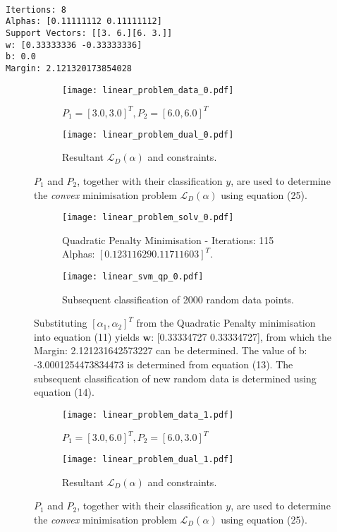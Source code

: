 \documentclass[10pt, a4paper,reqno]{amsart}
\begin{document}
\begin{verbatim}

Itertions: 8
Alphas: [0.11111112 0.11111112]
Support Vectors: [[3. 6.][6. 3.]]
w: [0.33333336 -0.33333336]
b: 0.0
Margin: 2.121320173854028

\end{verbatim}

\begin{figure}[H]
	\centering	
	\begin{subfigure}{1.0\textwidth}
		\centering
		\texttt{[image: linear\_problem\_data\_0.pdf]}
		\caption{$P_1 = [3.0, 3.0]^T, P_2 = [6.0, 6.0]^T$}
	\end{subfigure}
	\begin{subfigure}{1.0\textwidth}
		\centering
		\texttt{[image: linear\_problem\_dual\_0.pdf]}
		\caption{Resultant $\mathcal{L}_D(\alpha)$ and constraints.}
	\end{subfigure}
	\caption{$P_1$ and $P_2$, together with their classification $y$, are used to determine the \emph{convex} minimisation problem $\mathcal{L}_D(\alpha)$ using equation (25).}
\end{figure}

\begin{figure}[H]
	\centering	
	\begin{subfigure}{1.0\textwidth}
		\centering
		\texttt{[image: linear\_problem\_solv\_0.pdf]}
		\caption{Quadratic Penalty Minimisation - Iterations: 115 Alphas: $[0.12311629 0.11711603]^T$.}
	\end{subfigure}
	\begin{subfigure}{1.0\textwidth}
		\centering
		\texttt{[image: linear\_svm\_qp\_0.pdf]}
		\caption{Subsequent classification of 2000 random data points.}
	\end{subfigure}
	\caption{Substituting $[\alpha_1, \alpha_2]^T$ from the Quadratic Penalty minimisation into equation (11) yields $\mathbf{w}$:
 [0.33334727 0.33334727], from which the Margin: 2.121231642573227 can be determined. The value of b: -3.0001254473834473 is determined from equation (13). The subsequent classification of new random data is determined using equation (14).}
\end{figure}

\begin{figure}[H]
	\centering	
	\begin{subfigure}{1.0\textwidth}
		\centering
		\texttt{[image: linear\_problem\_data\_1.pdf]}
		\caption{$P_1 = [3.0, 6.0]^T, P_2 = [6.0, 3.0]^T$}
	\end{subfigure}
	\begin{subfigure}{1.0\textwidth}
		\centering
		\texttt{[image: linear\_problem\_dual\_1.pdf]}
		\caption{Resultant $\mathcal{L}_D(\alpha)$ and constraints.}
	\end{subfigure}
	\caption{$P_1$ and $P_2$, together with their classification $y$, are used to determine the \emph{convex} minimisation problem $\mathcal{L}_D(\alpha)$ using equation (25).}
\end{figure}
\end{document}
